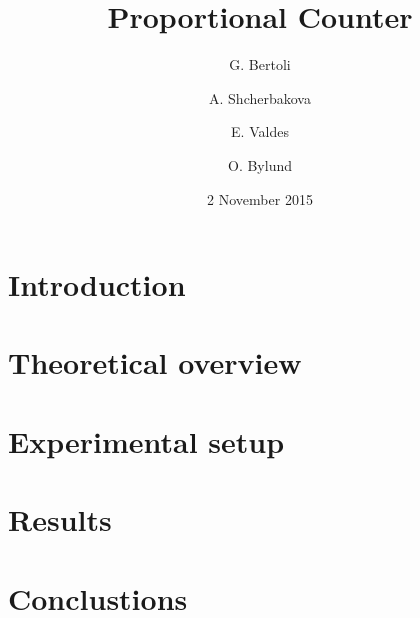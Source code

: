 \documentclass[a4paper, 10pt, notitlepage]{article}
\author{G. Bertoli \and A. Shcherbakova \and E. Valdes \and O. Bylund}
\title{Proportional Counter}
\date{2 November 2015}
\begin{document}
\maketitle

\begin{abstract}
  
\end{abstract}

\section{Introduction}
\label{sec:intro}


\section{Theoretical overview}
\label{sec:theory}


\section{Experimental setup}
\label{sec:setup}


\section{Results}
\label{sec:results}


\section{Conclustions}
\label{sec:conclusions}

\end{document}
